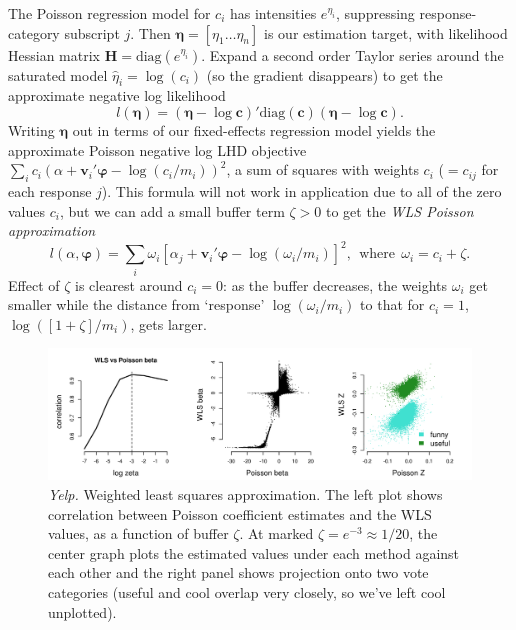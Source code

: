 \documentclass[12pt]{article}
\newcommand{\bs}[1]{\boldsymbol{#1}}
\newcommand{\mr}[1]{\mathrm{#1}}
\newcommand{\bm}[1]{\mathbf{#1}}
\begin{document}
The Poisson regression model for $c_i$ has intensities $e^{\eta_{i}}$, suppressing response-category subscript $j$. Then
 $\bs{\eta} = [\eta_{1} \ldots \eta_{n}]$ is our estimation target,
with likelihood Hessian matrix $\bm{H} = \mr{diag}(e^{\eta_{i}})$.
Expand a second order Taylor series around the saturated model $\hat\eta_{i}
= \log(c_{i})$ (so the gradient disappears) to get the approximate negative
log likelihood 
\begin{equation}
l(\bs{\eta}) = (\bs{\eta} - \log\bm{c})'
\mr{diag}( \bm{c} )(\bs{\eta} - \log\bm{c}). 
\end{equation} 
Writing $\bs{\eta}$
out in terms of our fixed-effects regression model yields the approximate
Poisson negative log LHD objective $\sum_i c_{i}(\alpha +
\bm{v}_i'\bs{\varphi} - \log(c_{i}/m_i))^2$, a sum of squares with weights $c_{i}$ ($=c_{ij}$ for each response $j$). This formula will not work in application due to all of the zero values $c_i$, but we can add a small buffer term $\zeta > 0$ to get the {\it WLS Poisson approximation}
\begin{equation}\label{wls}
l(\alpha, \bs{\varphi}) = \sum_i \omega_i
\left[\alpha_j + \bm{v}_i'\bs{\varphi} - \log(\omega_i/m_i)\right]^2, ~~\text{where}~~\omega_i = c_i + \zeta.
\end{equation}
Effect of $\zeta$ is clearest around $c_i = 0$: as the buffer decreases, the weights $\omega_i$ get smaller while the distance from `response' $\log(\omega_i/m_i)$ to that for $c_i=1$, $\log( [1+\zeta]/m_i )$, gets larger.

\begin{figure}
\includegraphics[width=6.5in]{../graphs/wlscompare}
\caption{\label{wlspic} {\it Yelp.} Weighted least squares approximation.  The left plot shows correlation between  Poisson coefficient estimates and the WLS values, as a function of buffer $\zeta$. At marked $\zeta=e^{-3}\approx 1/20$, the center graph plots the estimated values under each method against each other and the right panel shows projection onto two vote categories (useful and cool overlap very closely, so we've left cool unplotted).}
\end{figure}
\end{document}

